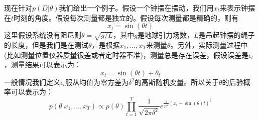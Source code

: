 \documentclass[10pt,a4paper,UTF8]{article}
\begin{document}
\begin{instance}
现在针对\(p(D|\theta)\)我们给出一个例子。假设一个钟摆在摆动，我们用\(x_{t}\)来表示钟摆在\(t\)时刻的角度。假设每次测量都是独立的。假设每次测量都是精确的，则有
\begin{equation}
\label{eq:8}
x_{t} = \sin(\theta t)
\end{equation}
这里假设系统没有阻尼则\(\theta = \sqrt{g/L}\)，其中\(g\)是地球引力场数，\(L\)是吊起钟摆的绳子的长度，但是我们是在测试\(\theta\)，是根据\(x_{1},\ldots ,x_{T}\)来测量\(\theta\)。另外，实际测量过程中(比如测量位置仪器质量很差或者定时器不准)，测量总是存在误差，假设误差是\(\epsilon_{t}\)，测量结果可以表示为：
\begin{equation}
\label{eq:9}
x_{t} = \sin(\theta t) + \theta_{t}
\end{equation}
一般情况我们定义\(\epsilon_{t}\)服从均值为零方差为\(\delta^{2}\)的高斯随机变量。所以关于\(\theta\)的后验概率可以表示为：
\begin{equation}
\label{eq:10}
p(\theta|x_{1},\ldots,x_{T}) \propto p(\theta)\prod_{t=1}^{T}\frac{1}{\sqrt{2\pi \delta^{2}}}e^{\frac{1}{2\delta^{2}}(x_{t}-\sin(\theta)t)^{2}}
\end{equation}
\end{instance}
\end{document}
